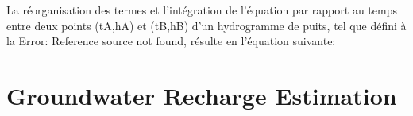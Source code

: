 \documentclass[WHATMANUAL.tex]{subfiles}
\begin{document}
La réorganisation des termes et l’intégration de l’équation
 par rapport au temps entre deux points (tA,hA) et (tB,hB) d'un hydrogramme de puits, tel que défini à la Error: Reference source not found, résulte en l’équation suivante:
 
\section{Groundwater Recharge Estimation}
\end{document}
